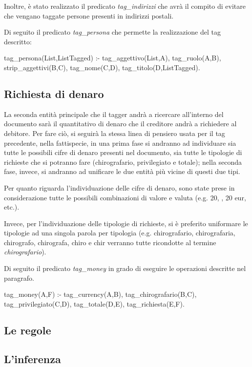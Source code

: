 Inoltre, è stato realizzato il predicato \emph{tag\_indirizzi} che avrà il compito di evitare che vengano taggate persone presenti in indirizzi postali.

Di seguito il predicato \emph{tag\_persona} che permette la realizzazione del tag descritto:

\begin{prologcode}
tag_persona(List,ListTagged) :-
    tag_aggettivo(List,A),
    tag_ruolo(A,B),
    strip_aggettivi(B,C),
    tag_nome(C,D),
    tag_titolo(D,ListTagged).
\end{prologcode}

\subsection{Richiesta di denaro}
La seconda entità principale che il tagger andrà a ricercare all'interno del documento sarà il quantitativo di denaro che il creditore andrà a richiedere al debitore. Per fare ciò, si seguirà la stessa linea di pensiero usata per il tag precedente, nella fattispecie, in una prima fase si andranno ad individuare sia tutte le possibili cifre di denaro presenti nel documento, sia tutte le tipologie di richieste che si potranno fare (chirografario, privilegiato e totale); nella seconda fase, invece, si andranno ad unificare le due entità più vicine di questi due tipi.

Per quanto riguarda l'individuazione delle cifre di denaro, sono state prese in considerazione tutte le possibili combinazioni di valore e valuta (e.g. 20\texteuro, , 20 eur, etc.).

Invece, per l'individuazione delle tipologie di richieste, si è preferito uniformare le tipologie ad una singola parola per tipologia (e.g. chirografario, chirografaria, chirografo, chirografa, chiro e chir verranno tutte ricondotte al termine \emph{chirografario}).

Di seguito il predicato \emph{tag\_money} in grado di eseguire le operazioni descritte nel paragrafo.


\begin{prologcode}
tag_money(A,F) :- 
    tag_currency(A,B),
    tag_chirografario(B,C),
    tag_privilegiato(C,D),
    tag_totale(D,E),
    tag_richiesta(E,F).
\end{prologcode}


\subsection{Le regole}
\subsection{L'inferenza}
